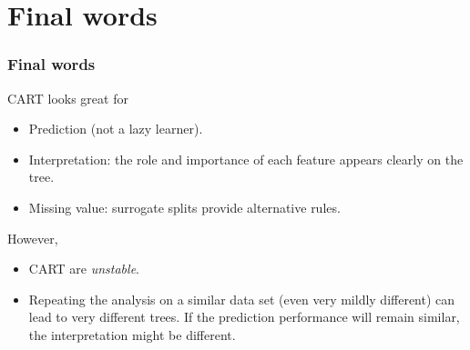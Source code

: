 \section{Final words}
\begin{frame}
\frametitle{Final words}
CART looks great for
\begin{itemize}
\item Prediction (not a lazy learner).
\item Interpretation: the role and importance of each feature appears clearly on the tree.
\item Missing value: surrogate splits provide alternative rules.
\end{itemize}
However, 
\begin{itemize}
\item CART are {\it unstable}. 
\item Repeating the analysis on a similar data set (even very mildly different) can lead to very different trees. If the prediction performance will remain similar, the interpretation might be different.
\end{itemize}
\end{frame}


